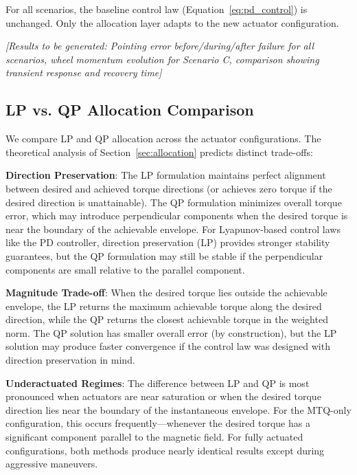 \documentclass[conference]{IEEEtran}
\begin{document}
For all scenarios, the baseline control law (Equation~\ref{eq:pd_control}) is unchanged. Only the allocation layer adapts to the new actuator configuration.

\emph{[Results to be generated: Pointing error before/during/after failure for all scenarios, wheel momentum evolution for Scenario C, comparison showing transient response and recovery time]}

\subsection{LP vs. QP Allocation Comparison}
We compare LP and QP allocation across the actuator configurations. The theoretical analysis of Section~\ref{sec:allocation} predicts distinct trade-offs:

\textbf{Direction Preservation}: The LP formulation maintains perfect alignment between desired and achieved torque directions (or achieves zero torque if the desired direction is unattainable). The QP formulation minimizes overall torque error, which may introduce perpendicular components when the desired torque is near the boundary of the achievable envelope. For Lyapunov-based control laws like the PD controller, direction preservation (LP) provides stronger stability guarantees, but the QP formulation may still be stable if the perpendicular components are small relative to the parallel component.

\textbf{Magnitude Trade-off}: When the desired torque lies outside the achievable envelope, the LP returns the maximum achievable torque along the desired direction, while the QP returns the closest achievable torque in the weighted norm. The QP solution has smaller overall error (by construction), but the LP solution may produce faster convergence if the control law was designed with direction preservation in mind.

\textbf{Underactuated Regimes}: The difference between LP and QP is most pronounced when actuators are near saturation or when the desired torque direction lies near the boundary of the instantaneous envelope. For the MTQ-only configuration, this occurs frequently---whenever the desired torque has a significant component parallel to the magnetic field. For fully actuated configurations, both methods produce nearly identical results except during aggressive maneuvers.
\end{document}

